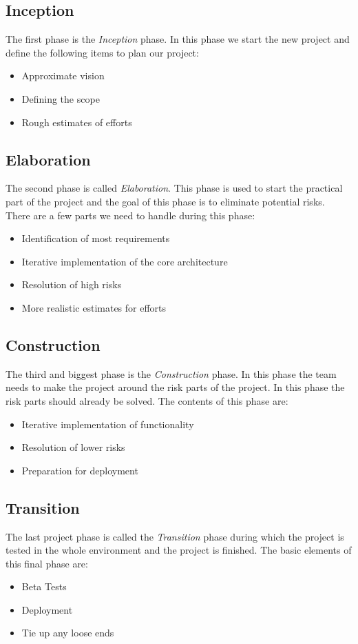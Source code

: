\subsection{Inception}
The first phase is the \textit{Inception} phase. In this phase we start the new project and  define the following items to plan our project:
\begin{itemize}
    \item Approximate vision
    \item Defining the scope
    \item Rough estimates of efforts
\end{itemize}

\subsection{Elaboration}
The second phase is called \textit{Elaboration}. This phase is used to start the practical part of the project and the goal of this phase is to eliminate potential risks. There are a few parts we need to handle during this phase:
\begin{itemize}
    \item Identification of most requirements
    \item Iterative implementation of the core architecture
    \item Resolution of high risks
    \item More realistic estimates for efforts
\end{itemize}

\subsection{Construction}
The third and biggest phase is the \textit{Construction} phase. In this phase the team needs to make the project around the risk parts of the project. In this phase the risk parts should already be solved.
The contents of this phase are:
\begin{itemize}
    \item Iterative implementation of functionality
    \item Resolution of lower risks
    \item Preparation for deployment
\end{itemize}

\subsection{Transition}
The last project phase is called the \textit{Transition} phase during which the project is tested in the whole environment and the project is finished.
The basic elements of this final phase are:
\begin{itemize}
    \item Beta Tests
    \item Deployment
    \item Tie up any loose ends
\end{itemize}

